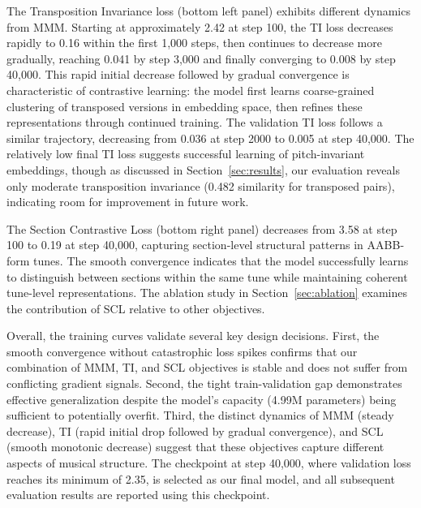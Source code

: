 \documentclass[]{interact}
\theoremstyle{plain}
\theoremstyle{definition}
\theoremstyle{remark}
\begin{document}
The Transposition Invariance loss (bottom left panel) exhibits different dynamics from MMM. Starting at approximately 2.42 at step 100, the TI loss decreases rapidly to 0.16 within the first 1,000 steps, then continues to decrease more gradually, reaching 0.041 by step 3,000 and finally converging to 0.008 by step 40,000. This rapid initial decrease followed by gradual convergence is characteristic of contrastive learning: the model first learns coarse-grained clustering of transposed versions in embedding space, then refines these representations through continued training. The validation TI loss follows a similar trajectory, decreasing from 0.036 at step 2000 to 0.005 at step 40,000. The relatively low final TI loss suggests successful learning of pitch-invariant embeddings, though as discussed in Section~\ref{sec:results}, our evaluation reveals only moderate transposition invariance (0.482 similarity for transposed pairs), indicating room for improvement in future work.

The Section Contrastive Loss (bottom right panel) decreases from 3.58 at step 100 to 0.19 at step 40,000, capturing section-level structural patterns in AABB-form tunes. The smooth convergence indicates that the model successfully learns to distinguish between sections within the same tune while maintaining coherent tune-level representations. The ablation study in Section~\ref{sec:ablation} examines the contribution of SCL relative to other objectives.

Overall, the training curves validate several key design decisions. First, the smooth convergence without catastrophic loss spikes confirms that our combination of MMM, TI, and SCL objectives is stable and does not suffer from conflicting gradient signals. Second, the tight train-validation gap demonstrates effective generalization despite the model's capacity (4.99M parameters) being sufficient to potentially overfit. Third, the distinct dynamics of MMM (steady decrease), TI (rapid initial drop followed by gradual convergence), and SCL (smooth monotonic decrease) suggest that these objectives capture different aspects of musical structure. The checkpoint at step 40,000, where validation loss reaches its minimum of 2.35, is selected as our final model, and all subsequent evaluation results are reported using this checkpoint.
\end{document}

